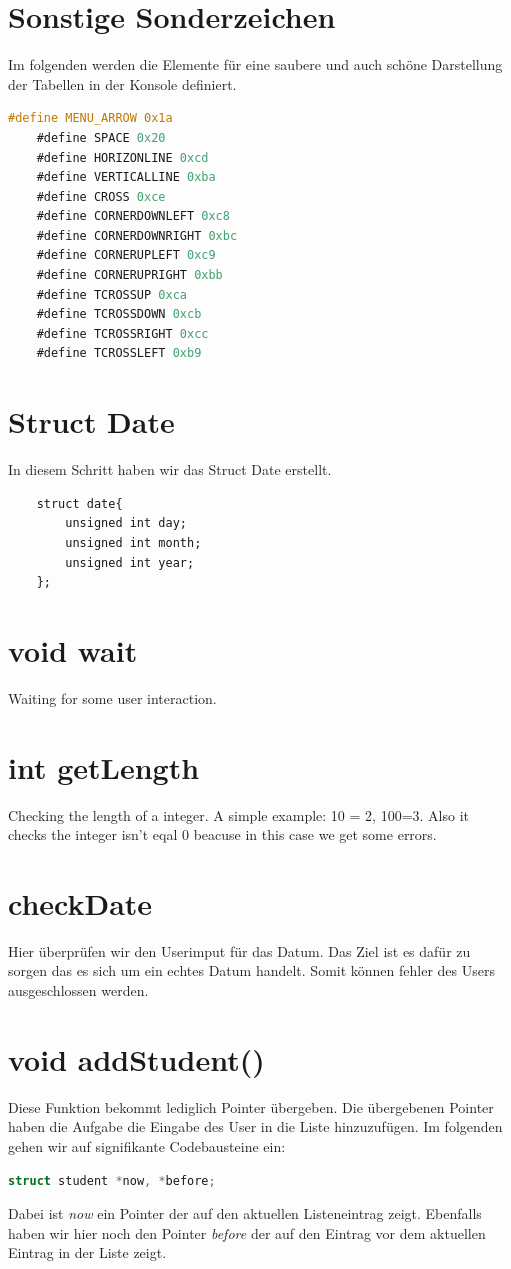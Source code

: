 \documentclass[a4paper, 11pt, oneside]{book} %
\begin{document}
\section{Sonstige Sonderzeichen}
Im folgenden werden die Elemente für eine saubere und auch schöne Darstellung der Tabellen in der Konsole definiert.
\begin{lstlisting}[language=C]
	#define MENU_ARROW 0x1a
	#define SPACE 0x20
	#define HORIZONLINE 0xcd
	#define VERTICALLINE 0xba
	#define CROSS 0xce
	#define CORNERDOWNLEFT 0xc8 
	#define CORNERDOWNRIGHT 0xbc 
	#define CORNERUPLEFT 0xc9 
	#define CORNERUPRIGHT 0xbb 
	#define TCROSSUP 0xca 
	#define TCROSSDOWN 0xcb 
	#define TCROSSRIGHT 0xcc 
	#define TCROSSLEFT 0xb9 
\end{lstlisting}

\section{Struct Date}
In diesem Schritt haben wir das Struct Date erstellt.
\begin{lstlisting}
	struct date{
        unsigned int day;
        unsigned int month;
        unsigned int year;
	};
\end{lstlisting}
\section{void wait}
Waiting for some user interaction.
\section{int getLength}
Checking the length of a integer. A simple example: 10 = 2, 100=3. Also it checks the integer isn't eqal 0 beacuse in this case we get some errors.

\section{checkDate}
Hier überprüfen wir den Userimput für das Datum. Das Ziel ist es dafür zu sorgen das es sich um ein echtes Datum handelt. Somit können fehler des Users ausgeschlossen werden.

\section{void addStudent()}
Diese Funktion bekommt lediglich Pointer übergeben. Die übergebenen Pointer haben die Aufgabe die Eingabe des User in die Liste hinzuzufügen. Im folgenden gehen wir auf signifikante Codebausteine ein:
\begin{lstlisting}[language=C]
	struct student *now, *before;
\end{lstlisting}
Dabei ist \textit{now} ein Pointer der auf den aktuellen Listeneintrag zeigt. Ebenfalls haben wir hier noch den Pointer \textit{before} der auf den Eintrag vor dem aktuellen Eintrag in der Liste zeigt.
\end{document}
